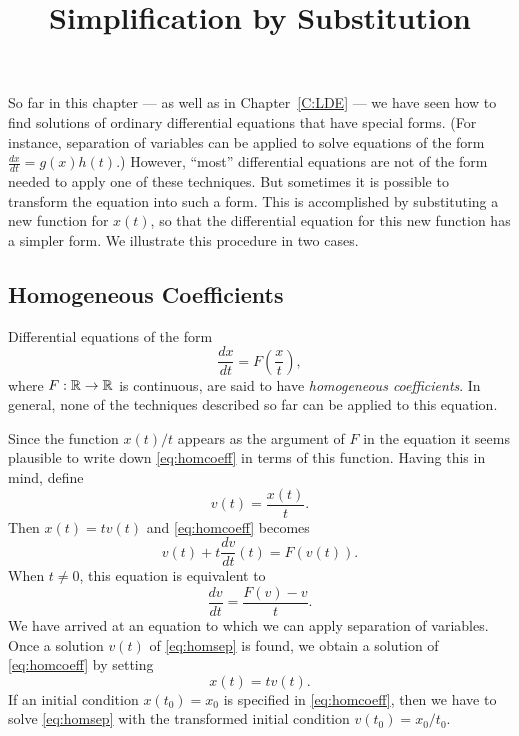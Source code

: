 \documentclass{ximera}
\title{Simplification by Substitution}
\begin{document}
\begin{abstract}
\end{abstract}
\maketitle


\label{sec:SBS}

So far in this chapter --- as well as in Chapter~\ref{C:LDE} ---
we have seen how to find solutions of ordinary differential equations 
that have special forms.  (For instance, separation of variables can 
be applied to solve equations of the form $\frac{dx}{dt}=g(x) h(t)$.) 
However, ``most'' differential equations are not of the form needed to
apply one of these techniques.  But sometimes it is possible to
transform the equation into such a form.  This is accomplished
by substituting a new function for $x(t)$, so that the differential 
equation for this new function has a simpler form.  We illustrate this 
procedure in two cases.

\subsection*{Homogeneous Coefficients}

Differential equations of the form
\begin{equation}
\label{eq:homcoeff}
\frac{dx}{dt} = F\left(\frac{x}{t}\right),
\end{equation}
where $F:\mbox{$\Bbb{R}$}\to\mbox{$\Bbb{R}$}$ is continuous, are said to have {\em
homogeneous coefficients}.  
In general, none of the techniques
described so far can be applied to this equation.  

Since the function $x(t)/t$ appears as the argument of $F$ in
the equation it seems plausible to write down \eqref{eq:homcoeff}
in terms of this function.  Having this in mind, define
\[
v(t) = \frac{x(t)}{t}.
\]
Then $x(t) = t v(t)$ and \eqref{eq:homcoeff} becomes
\[
v(t) + t \frac{dv}{dt}(t) = F(v(t)).
\]
When $t\not= 0$, this equation is equivalent to
\begin{equation}
\label{eq:homsep}
\frac{dv}{dt} = \frac{F(v)-v}{t}.
\end{equation}
We have arrived at an equation to which we can apply separation
of variables.  
Once a solution $v(t)$ of \eqref{eq:homsep} is
found, we obtain a solution of \eqref{eq:homcoeff} by setting
\[
x(t) = t v(t).
\]
If an initial condition $x(t_0)=x_0$ is specified in
\eqref{eq:homcoeff}, then we have to solve \eqref{eq:homsep} with
the transformed initial condition $v(t_0)=x_0/t_0$.
\end{document}
